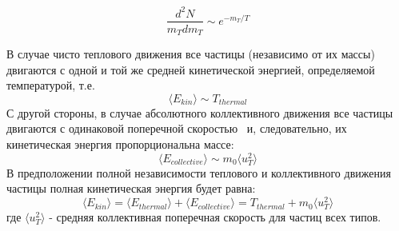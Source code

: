 \begin{equation}
	\frac{d^2N}{m_Tdm_T} \sim e^{-m_T/T}
	\label{eq:InvSlopeRon}
\end{equation}

В случае чисто теплового движения все частицы (независимо от их массы) двигаются с одной и той же средней кинетической энергией, определяемой температурой, т.е.
$$\langle E_{kin} \rangle \sim T_{thermal}$$
С другой стороны, в случае абсолютного коллективного движения все частицы двигаются с одинаковой поперечной скоростью \ut \ и, следовательно, их кинетическая энергия пропорциональна массе:
$$\langle E_{collective} \rangle \sim m_0 \langle u_T ^2 \rangle $$
В предположении полной независимости теплового и коллективного движения частицы полная кинетическая энергия будет равна:
$$ \langle E_{kin} \rangle = \langle E_{thermal} \rangle + \langle E_{collective} \rangle = T_{thermal}+ m_0 \langle u_T ^2 \rangle $$
где $ \langle u_T ^2 \rangle$ - средняя коллективная поперечная скорость для частиц всех типов. 



